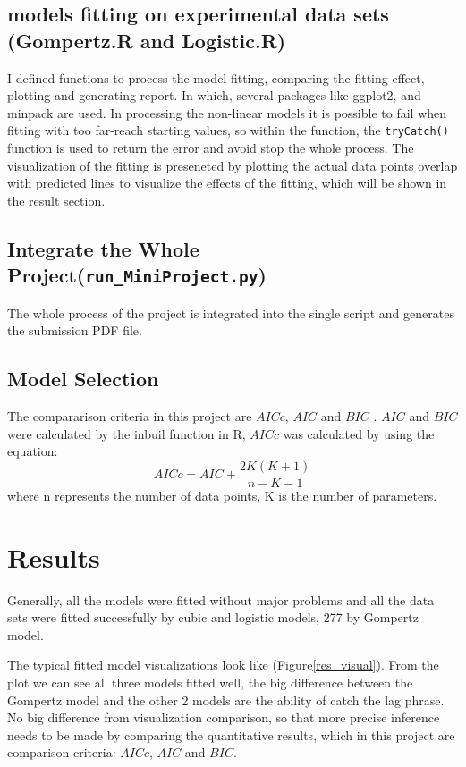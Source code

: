 \documentclass[11pt, a4paper]{article}
\begin{document}
\subsection{models fitting on experimental data sets (Gompertz.R and Logistic.R)}

I defined functions to process the model fitting, comparing the fitting effect, plotting and generating report. In which, several packages like ggplot2, and minpack are used. In processing the non-linear models it is possible to fail when fitting with too far-reach starting values, so within the function, the \verb|tryCatch()| function is used to return the error and avoid stop the whole process. The visualization of the fitting is preseneted by plotting the actual data points overlap with predicted lines to visualize the effects of the fitting, which will be shown in the result section.

\subsection{Integrate the Whole Project(\texttt{run\_MiniProject.py})}
The whole process of the project is integrated into the single script and generates the submission PDF file.

\subsection{Model Selection}
The compararison criteria in this project are  $AICc$, $AIC$ and $BIC$ \citep{anderson2004model}. $AIC$ and $BIC$ were calculated by the inbuil function in R, $AICc$ was calculated by using the equation: \begin{equation}\label{eqn:AICc}
    AICc = AIC + \frac{2K(K+1)}{n−K−1}
\end{equation} where n represents the number of data points, K is the number of parameters. 


\section{Results}
Generally, all the models were fitted without major problems and all the data sets were fitted successfully by cubic and logistic models, 277 by Gompertz model. 

The typical fitted model visualizations look like (Figure\ref{res_visual}). From the plot we can see all three models fitted well, the big difference between the Gompertz model and the other 2 models are the ability of catch the lag phrase. No big difference from visualization comparison, so that more precise inference needs to be made by comparing the quantitative results, which in this project are comparison criteria: $AICc$, $AIC$ and $BIC$.
\end{document}
